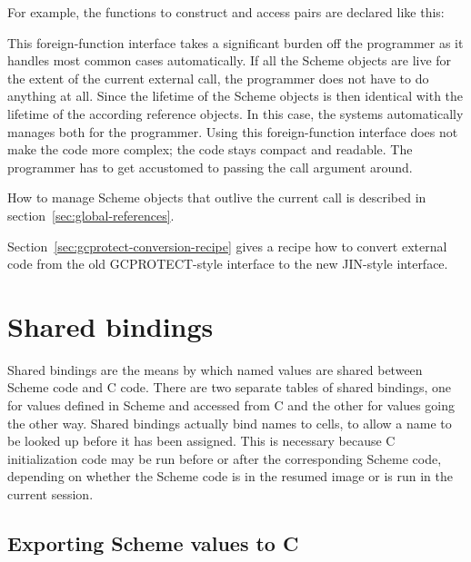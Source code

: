 For example, the functions to construct and access pairs are declared
like this:

\begin{protos}
\end{protos}

This foreign-function interface takes a significant burden off the
programmer as it handles most common cases automatically.  If all the
Scheme objects are live for the extent of the current external call,
the programmer does not have to do anything at all.  Since the
lifetime of the Scheme objects is then identical with the lifetime of
the according reference objects.  In this case, the systems
automatically manages both for the programmer.  Using this
foreign-function interface does not make the code more complex; the
code stays compact and readable.  The programmer has to get accustomed
to passing the call argument around.

How to manage Scheme objects that outlive the current call is described
in section~\ref{sec:global-references}.

Section~\ref{sec:gcprotect-conversion-recipe} gives a recipe how to
convert external code from the old GCPROTECT-style interface to the
new JIN-style interface.


\section{Shared bindings}
\label{sec:shared-bindings}

Shared bindings are the means by which named values are shared between Scheme
 code and C code.
There are two separate tables of shared bindings, one for values defined in
 Scheme and accessed from C and the other for values going the other way.
Shared bindings actually bind names to cells, to allow a name to be looked
 up before it has been assigned.
This is necessary because C initialization code may be run before or after
 the corresponding Scheme code, depending on whether the Scheme code is in
 the resumed image or is run in the current session.

\subsection{Exporting Scheme values to C}


